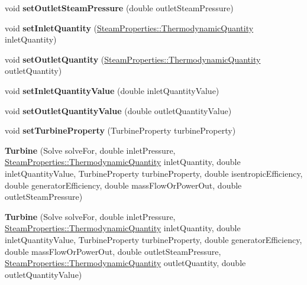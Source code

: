 \begin{DoxyCompactItemize}
void {\bfseries set\+Outlet\+Steam\+Pressure} (double outlet\+Steam\+Pressure)
\item 
\mbox{\label{class_turbine_aecc05c70870fb11bbc0bb4fe5d8438bd}} 
void {\bfseries set\+Inlet\+Quantity} (\hyperlink{class_steam_properties_ae0294bedf7d178c2d8fb6aed0f62fbff}{Steam\+Properties\+::\+Thermodynamic\+Quantity} inlet\+Quantity)
\item 
\mbox{\label{class_turbine_ad5ff4ba1657aac9519a6841336ec571c}} 
void {\bfseries set\+Outlet\+Quantity} (\hyperlink{class_steam_properties_ae0294bedf7d178c2d8fb6aed0f62fbff}{Steam\+Properties\+::\+Thermodynamic\+Quantity} outlet\+Quantity)
\item 
\mbox{\label{class_turbine_ac01a053462c83e21ecc2158e75477542}} 
void {\bfseries set\+Inlet\+Quantity\+Value} (double inlet\+Quantity\+Value)
\item 
\mbox{\label{class_turbine_ab37326068f633280de8f8144b9c8eb89}} 
void {\bfseries set\+Outlet\+Quantity\+Value} (double outlet\+Quantity\+Value)
\item 
\mbox{\label{class_turbine_abb3f16cefe52f4e9c7b32b2bb17a68ee}} 
void {\bfseries set\+Turbine\+Property} (Turbine\+Property turbine\+Property)
\item 
\mbox{\label{class_turbine_a3c3c871b9fe57d48dd06b109794381dc}} 
{\bfseries Turbine} (Solve solve\+For, double inlet\+Pressure, \hyperlink{class_steam_properties_ae0294bedf7d178c2d8fb6aed0f62fbff}{Steam\+Properties\+::\+Thermodynamic\+Quantity} inlet\+Quantity, double inlet\+Quantity\+Value, Turbine\+Property turbine\+Property, double isentropic\+Efficiency, double generator\+Efficiency, double mass\+Flow\+Or\+Power\+Out, double outlet\+Steam\+Pressure)
\item 
\mbox{\label{class_turbine_a1ec182906c075407882de542954d9030}} 
{\bfseries Turbine} (Solve solve\+For, double inlet\+Pressure, \hyperlink{class_steam_properties_ae0294bedf7d178c2d8fb6aed0f62fbff}{Steam\+Properties\+::\+Thermodynamic\+Quantity} inlet\+Quantity, double inlet\+Quantity\+Value, Turbine\+Property turbine\+Property, double generator\+Efficiency, double mass\+Flow\+Or\+Power\+Out, double outlet\+Steam\+Pressure, \hyperlink{class_steam_properties_ae0294bedf7d178c2d8fb6aed0f62fbff}{Steam\+Properties\+::\+Thermodynamic\+Quantity} outlet\+Quantity, double outlet\+Quantity\+Value)

\end{DoxyCompactItemize}
